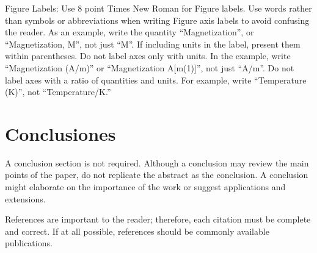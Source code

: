 \documentclass[spanish, letterpaper, 12 pt, conference]{ieeeconf}  %
\begin{document}
   

Figure Labels: Use 8 point Times New Roman for Figure labels. Use words rather than symbols or abbreviations when writing Figure axis labels to avoid confusing the reader. As an example, write the quantity ``Magnetization'', or ``Magnetization, M'', not just ``M''. If including units in the label, present them within parentheses. Do not label axes only with units. In the example, write ``Magnetization (A/m)'' or ``Magnetization {A[m(1)]}'', not just ``A/m''. Do not label axes with a ratio of quantities and units. For example, write ``Temperature (K)'', not ``Temperature/K.''

\section{Conclusiones}

A conclusion section is not required. Although a conclusion may review the main points of the paper, do not replicate the abstract as the conclusion. A conclusion might elaborate on the importance of the work or suggest applications and extensions. 

\addtolength{\textheight}{-12cm}   %







%
%
%
%



References are important to the reader; therefore, each citation must be complete and correct. If at all possible, references should be commonly available publications.

{}

\end{document}
